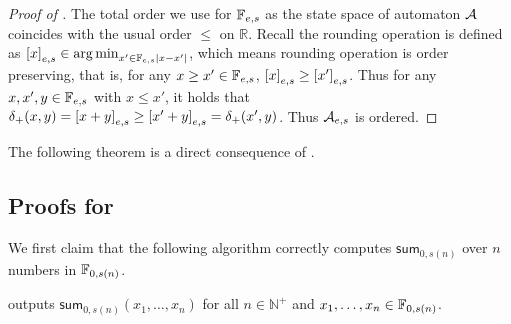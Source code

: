 \begin{proof}[Proof of ]
	The total order we use for $\mathbb{F}_{e,s}$ as the state space of automaton ${\mathcal{A}}$ coincides with the usual order $\le$ on $\mathbb{R}$. Recall the rounding operation is defined as $\left[x\right]_{e,s}\in \operatorname*{arg\,min}_{x'\in \mathbb{F}_{e,s} \left| x-x' \right|}$, which means rounding operation is order preserving, that is, for any $x\ge x'\in\mathbb{F}_{e,s}$, $\left[x\right]_{e,s}\ge \left[x'\right]_{e,s}$. Thus for any $x,x',y\in\mathbb{F}_{e,s}$ with $x\le x'$, it holds that $\delta_+(x,y) = \left[x+y\right]_{e,s}\ge \left[x'+y\right]_{e,s} = \delta_+(x',y) $. Thus ${\mathcal{A}}_{e,s}$ is ordered.
\end{proof}

The following theorem  is a direct consequence of .

\subsection{Proofs for }\label{appsec:TC0_upper_bound}


	We first claim that the following algorithm  correctly computes $\mathsf{sum}_{0,s(n)}$ over $n$ numbers in $\mathbb{F}_{0,s(n)}$.
	
\begin{lemma}\label{lem:TC0_gridworld_algorithm_correct}
	 outputs $\mathsf{sum}_{0,s(n)}(x_1,\ldots,x_n)$ for all $n\in\mathbb{N}^+$ and $x_1,\ldots,x_n\in\mathbb{F}_{0,s(n)}$. 
\end{lemma}

